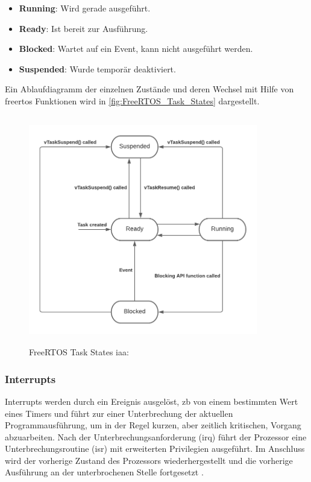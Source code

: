 \documentclass[../EDF Master Thesis.tex]{subfiles}
\begin{document}
\begin{itemize}
    \item \textbf{Running}: Wird gerade ausgeführt.
    \item \textbf{Ready}: Ist bereit zur Ausführung.
    \item \textbf{Blocked}: Wartet auf ein Event, kann nicht ausgeführt werden.
    \item \textbf{Suspended}: Wurde temporär deaktiviert.
\end{itemize}

Ein Ablaufdiagramm der einzelnen Zustände und deren Wechsel mit Hilfe von \ac{freertos} Funktionen wird in \autoref{fig:FreeRTOS_Task_States} dargestellt.

\begin{figure}[H]
    \centering
    \includegraphics[height=10cm, width=10cm]{./attachments/FreeRTOS_Task_States.pdf}
    \caption{FreeRTOS Task States \ac{iaa}: \parencite{freertos-task-states}}
    \label{fig:FreeRTOS_Task_States}
\end{figure}

\subsubsection{Interrupts}
Interrupts werden durch ein Ereignis ausgelöst, \ac{zb} von einem bestimmten Wert eines Timers und führt zur einer Unterbrechung der aktuellen Programmausführung, um in der Regel kurzen, aber zeitlich kritischen, Vorgang abzuarbeiten.
Nach der Unterbrechungsanforderung (\ac{irq}) führt der Prozessor eine Unterbrechungsroutine (\ac{isr}) mit erweiterten Privilegien ausgeführt.
Im Anschluss wird der vorherige Zustand des Prozessors wiederhergestellt und die vorherige Ausführung an der unterbrochenen Stelle fortgesetzt \parencite{wiki:008}.
\end{document}
